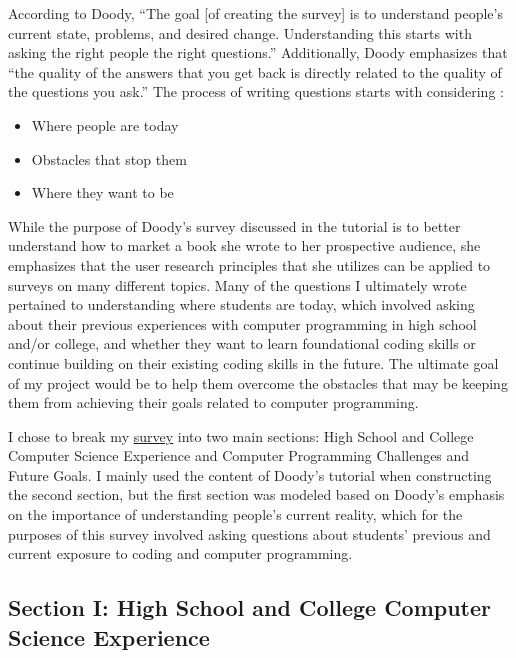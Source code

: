 \documentclass[10pt,twocolumn]{article}
\begin{document}
According to Doody, “The goal [of creating the survey] is to understand people’s current state, problems, and desired change. Understanding this starts with asking the right people the right questions.” Additionally, Doody emphasizes that “the quality of the answers that you get back is directly related to the quality of the questions you ask.” The process of writing questions starts with considering \cite{Tutorial}:
\begin{itemize}
    \item{Where people are today}
    \item{Obstacles that stop them}
    \item{Where they want to be}
\end{itemize}
While the purpose of Doody’s survey discussed in the tutorial is to better understand how to market a book she wrote to her prospective audience, she emphasizes that the user research principles that she utilizes can be applied to surveys on many different topics. Many of the questions I ultimately wrote pertained to understanding where students are today, which involved asking about their previous experiences with computer programming in high school and/or college, and whether they want to learn foundational coding skills or continue building on their existing coding skills in the future. The ultimate goal of my project would be to help them overcome the obstacles that may be keeping them from achieving their goals related to computer programming.  
 
I chose to break my \href{https://forms.gle/5nDPNGqh9LwYLMVQ6}{survey} into two main sections: High School and College Computer Science Experience and Computer Programming Challenges and Future Goals. I mainly used the content of Doody’s tutorial when constructing the second section, but the first section was modeled based on Doody’s emphasis on the importance of understanding people’s current reality, which for the purposes of this survey involved asking questions about students’ previous and current exposure to coding and computer programming.

\subsection{Section I: High School and College Computer Science Experience}
\end{document}
